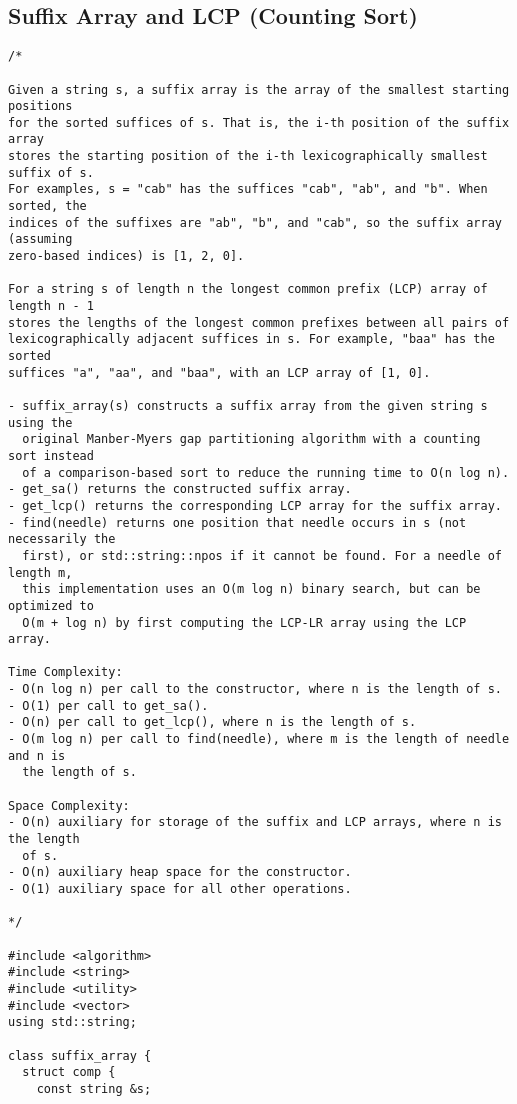 \subsection{Suffix Array and LCP (Counting Sort)}
\begin{lstlisting}
/*

Given a string s, a suffix array is the array of the smallest starting positions
for the sorted suffices of s. That is, the i-th position of the suffix array
stores the starting position of the i-th lexicographically smallest suffix of s.
For examples, s = "cab" has the suffices "cab", "ab", and "b". When sorted, the
indices of the suffixes are "ab", "b", and "cab", so the suffix array (assuming
zero-based indices) is [1, 2, 0].

For a string s of length n the longest common prefix (LCP) array of length n - 1
stores the lengths of the longest common prefixes between all pairs of
lexicographically adjacent suffices in s. For example, "baa" has the sorted
suffices "a", "aa", and "baa", with an LCP array of [1, 0].

- suffix_array(s) constructs a suffix array from the given string s using the
  original Manber-Myers gap partitioning algorithm with a counting sort instead
  of a comparison-based sort to reduce the running time to O(n log n).
- get_sa() returns the constructed suffix array.
- get_lcp() returns the corresponding LCP array for the suffix array.
- find(needle) returns one position that needle occurs in s (not necessarily the
  first), or std::string::npos if it cannot be found. For a needle of length m,
  this implementation uses an O(m log n) binary search, but can be optimized to
  O(m + log n) by first computing the LCP-LR array using the LCP array.

Time Complexity:
- O(n log n) per call to the constructor, where n is the length of s.
- O(1) per call to get_sa().
- O(n) per call to get_lcp(), where n is the length of s.
- O(m log n) per call to find(needle), where m is the length of needle and n is
  the length of s.

Space Complexity:
- O(n) auxiliary for storage of the suffix and LCP arrays, where n is the length
  of s.
- O(n) auxiliary heap space for the constructor.
- O(1) auxiliary space for all other operations.

*/

#include <algorithm>
#include <string>
#include <utility>
#include <vector>
using std::string;

class suffix_array {
  struct comp {
    const string &s;


\end{lstlisting}
